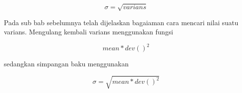 \documentclass[a4paper,10pt]{article}
\begin{document}
\begin{eulernotebook}
\begin{eulercomment}
\begin{eulercomment}
\begin{eulercomment}
\end{eulercomment}
\begin{eulerformula}
\[
\sigma=\sqrt{varians}
\]
\end{eulerformula}
\begin{eulercomment}
Pada sub bab sebelumnya telah dijelaskan bagaiaman cara mencari nilai
suatu varians. Mengulang kembali varians menggunakan fungsi 

\end{eulercomment}
\begin{eulerformula}
\[
mean*dev()^2
\]
\end{eulerformula}
\begin{eulercomment}
sedangkan simpangan baku menggunakan\\
\end{eulercomment}
\begin{eulerformula}
\[
\sigma=\sqrt{mean*dev()^2}
\]
\end{eulerformula}
\begin{eulerttcomment}
 

\end{eulerttcomment}
\end{eulercomment}
\end{eulercomment}
\end{eulernotebook}
\end{document}
